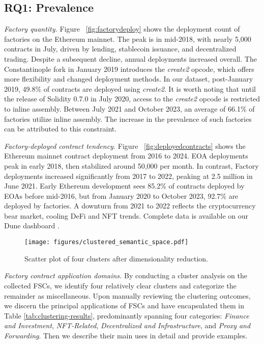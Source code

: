 \documentclass[acmsmall,screen]{acmart}
\begin{document}
	\subsection{RQ1: Prevalence}
	\textit{Factory quantity.}
	Figure ~\ref{fig:factorydeploy} shows the deployment count of factories on the Ethereum mainnet. The peak is in mid-2018, with nearly 5,000 contracts in July, driven by lending, stablecoin issuance, and decentralized trading. Despite a subsequent decline, annual deployments increased overall. The Constantinople fork in January 2019 introduces the \textit{create2} opcode, which offers more flexibility and changed deployment methods. In our dataset, post-January 2019, 49.8\% of contracts are deployed using \textit{create2}. It is worth noting that until the release of Solidity 0.7.0 in July 2020, access to the \textit{create2} opcode is restricted to inline assembly. Between July 2021 and October 2023, an average of 66.1\% of factories utilize inline assembly. The increase in the prevalence of such factories can be attributed to this constraint.


	\textit{Factory-deployed contract tendency.} Figure ~\ref{fig:deployedcontracts} shows  the Ethereum mainnet contract deployment from 2016 to 2024. EOA deployments peak in early 2018, then stabilized around 50,000 per month.  In contrast, Factory deployments increased significantly from 2017 to 2022, peaking at 2.5 million in June 2021. Early Ethereum development sees 85.2\% of contracts deployed by EOAs before mid-2016, but from January 2020 to October 2023, 92.7\% are deployed by factories. A downturn from 2021 to 2022 reflects the cryptocurrency bear market, cooling DeFi and NFT trends. Complete data is available on our Dune dashboard \cite{dunedashboard}.

	\begin{figure}[h]
		\centering
		\texttt{[image: figures/clustered\_semantic\_space.pdf]}
		\caption{Scatter plot of four clusters after dimensionality reduction.}
	\end{figure}

	\textit{Factory contract application domains.} By conducting a cluster analysis on the collected FSCs, we identify four relatively clear clusters and categorize the remainder as miscellaneous. Upon manually reviewing the clustering outcomes, we discern the principal applications of FSCs and have encapsulated them in Table \ref{tab:clustering-results}, predominantly spanning four categories: \textit{Finance and Investment}, \textit{NFT-Related}, \textit{Decentralized and Infrastructure}, and \textit{Proxy and Forwarding}. Then we describe their main uses in detail and provide examples.
\end{document}
